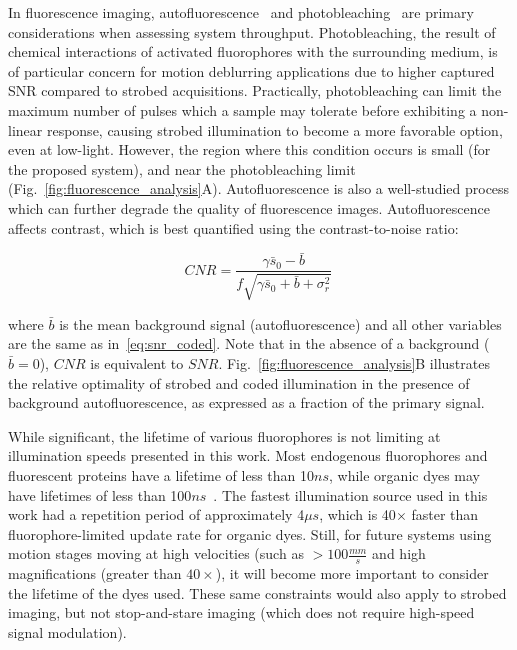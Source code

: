 In fluorescence imaging, autofluorescence~\cite{autofluor} and photobleaching~\cite{lippincott2003photobleaching} are primary considerations when assessing system throughput. Photobleaching, the result of chemical interactions of activated fluorophores with the surrounding medium, is of particular concern for motion deblurring applications due to higher captured SNR compared to strobed acquisitions. Practically, photobleaching can limit the maximum number of pulses which a sample may tolerate before exhibiting a non-linear response, causing strobed illumination to become a more favorable option, even at low-light. However, the region where this condition occurs is small (for the proposed system), and near the photobleaching limit (Fig.~\ref{fig:fluorescence_analysis}A). Autofluorescence is also a well-studied process which can further degrade the quality of fluorescence images. Autofluorescence affects contrast, which is best quantified using the contrast-to-noise ratio:

\begin{equation}
    \label{eq:cnr}
    CNR  = \frac{\gamma\bar{s}_0 - \bar{b}}{f\sqrt{\gamma\bar{s}_0 + \bar{b} + \sigma^2_{r}}}\:
\end{equation}

\noindent where $\bar{b}$ is the mean background signal (autofluorescence) and all other variables are the same as in~\eqref{eq:snr_coded}. Note that in the absence of a background ($\bar{b} = 0$), $CNR$ is equivalent to $SNR$. Fig.~\ref{fig:fluorescence_analysis}B illustrates the relative optimality of strobed and coded illumination in the presence of background autofluorescence, as expressed as a fraction of the primary signal.

While significant, the lifetime of various fluorophores is not limiting at illumination speeds presented in this work. Most endogenous fluorophores and fluorescent proteins have a lifetime of less than 10$ns$, while organic dyes may have lifetimes of less than 100$ns$~\cite{fluorlifetime2010}. The fastest illumination source used in this work had a repetition period of approximately 4$\mu s$, which is 40$\times$ faster than fluorophore-limited update rate for organic dyes. Still, for future systems using motion stages moving at high velocities (such as $>100\frac{mm}{s}$ and high magnifications (greater than $40\times$), it will become more important to consider the lifetime of the dyes used. These same constraints would also apply to strobed imaging, but not stop-and-stare imaging (which does not require high-speed signal modulation).



